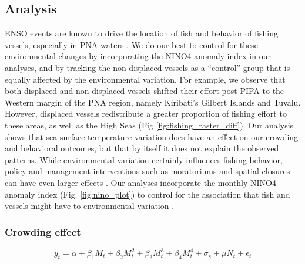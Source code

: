\documentclass[12pt]{article}
\begin{document}
\subsection{Analysis}

ENSO events are known to drive the location of fish and behavior of fishing vessels, especially in PNA waters \cite{lehodey_1997,kroodsma_2018,aqorau_2018}. We do our best to control for these environmental changes by incorporating the NINO4 anomaly index in our analyses, and by tracking the non-displaced vessels as a ``control'' group that is equally affected by the environmental variation. For example, we observe that both displaced and non-displaced vessels shifted their effort post-PIPA to the Western margin of the PNA region, namely Kiribati's Gilbert Islands and Tuvalu. However, displaced vessels redistribute a greater proportion of fishing effort to these areas, as well as the High Seas (Fig \ref{fig:fishing_raster_diff}). Our analysis shows that sea surface temperature variation does have an effect on our crowding and behavioral outcomes, but that by itself it does not explain the observed patterns. While environmental variation certainly influences fishing behavior, policy and management interventions such as moratoriums and spatial closures can have even larger effects \cite{kroodsma_2018}.  Our analyses incorporate the monthly NINO4 anomaly index (Fig. \ref{fig:nino_plot}) to control for the association that fish and vessels might have to environmental variation \cite{lehodey_1997,kroodsma_2018,aqorau_2018}.

\subsubsection{Crowding effect}

$$
y_t = \alpha + \beta_1 M_t + \beta_2 M_t^2 + \beta_3 M_t^3 + \beta_4 M_t ^4 + \sigma_s + \mu N_t + \epsilon_t
\label{eqn:sp_corr}
$$
\end{document}
